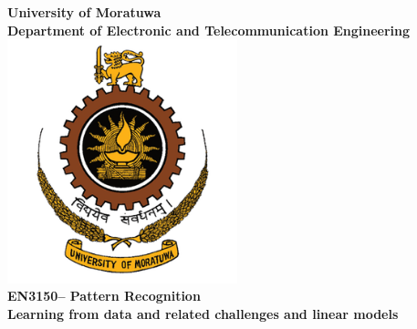 \documentclass[12pt]{article}
\newcommand{\universityname}{University of Moratuwa}                    %
\newcommand{\departmentname}{Department of Electronic and Telecommunication Engineering}  %
\newcommand{\modulecode}{EN3150}                                        %
\newcommand{\modulename}{Pattern Recognition}                    %
\newcommand{\assignmentname}{Learning from data and related challenges and linear models}  %
\begin{document}
\begin{titlepage}
    \centering
    \vspace*{1cm}

    {\huge\textbf{\universityname}}\\[1cm]

    {\Large\textbf{\departmentname}}\\[0.5cm]

    \includegraphics[width=0.5\textwidth]{resources/University_of_Moratuwa_logo.png}\\[1cm]

    {\large\textbf{\modulecode – \modulename}}\\[1cm]

    {\LARGE\textbf{\assignmentname}}\\[1cm]
    
    \vspace{0.3cm}
    
    
    

\end{titlepage}
\end{document}
